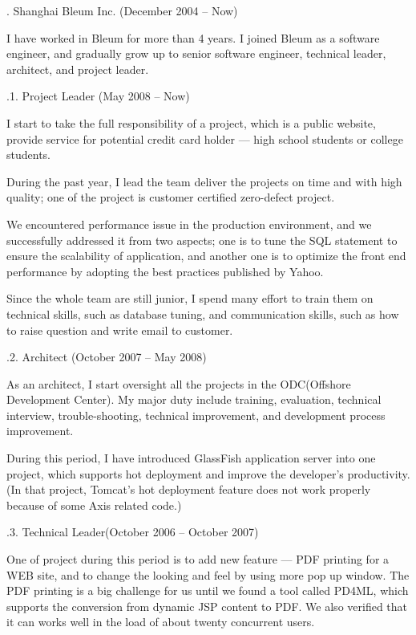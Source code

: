 . Shanghai Bleum Inc. (December 2004 -- Now)\par

\noindent
I have worked in Bleum for more than 4 years. I joined Bleum as a software  
engineer, and gradually grow up to senior software engineer, technical leader,
architect, and project leader. 

\smallskip\noindent
{}.1. Project Leader (May 2008 -- Now)\par
\noindent
I start to take the full responsibility of a project, which is a public website, provide service for 
potential credit card holder --- high school students or college students. 

During the past year, I lead the team deliver the projects on time and with high quality;
one of the project is customer certified zero-defect project.

We encountered performance issue in the production environment, and we successfully
addressed it from two aspects; one is to tune the SQL statement to ensure the scalability
of application, and another one is to optimize the front end performance by adopting
the best practices published by Yahoo.
  
Since the whole team are still junior, I spend many effort to train them on 
technical skills, such as database tuning, and communication skills, such as
how to raise question and write email to customer.

\smallskip\noindent
{}.2. Architect (October 2007 -- May 2008)\par
\noindent
As an architect, I start oversight all the projects in the ODC(Offshore Development Center).
My major duty include training, evaluation, technical interview, trouble-shooting,
 technical improvement, and development process improvement. 

During this period, I have introduced GlassFish application server into one project, which 
supports hot deployment and improve the developer's productivity. (In that project, Tomcat's
hot deployment feature does not work properly because of some Axis related code.)


.3. Technical Leader(October 2006 -- October 2007)\par
\noindent
One of project during this period is to add new feature --- PDF printing for a WEB site, and to
change the looking and feel by using more pop up window. The PDF printing 
is a big challenge for us until we found a tool called PD4ML, which supports
the conversion from dynamic JSP content to PDF. We also verified that it can 
works well in the load of about twenty concurrent users. 

